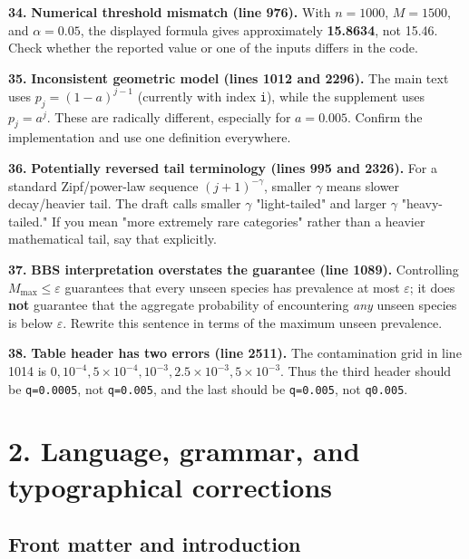\documentclass[10pt,a4paper]{article}
\begin{document}
\par\medskip\noindent\textbf{34.} \textbf{Numerical threshold mismatch (line 976).} With \(n=1000\), \(M=1500\), and \(\alpha=0.05\), the displayed formula gives approximately \textbf{15.8634}, not 15.46. Check whether the reported value or one of the inputs differs in the code.

\par\medskip\noindent\textbf{35.} \textbf{Inconsistent geometric model (lines 1012 and 2296).} The main text uses \(p_j=(1-a)^{j-1}\) (currently with index \texttt{i}), while the supplement uses \(p_j=a^j\). These are radically different, especially for \(a=0.005\). Confirm the implementation and use one definition everywhere.

\par\medskip\noindent\textbf{36.} \textbf{Potentially reversed tail terminology (lines 995 and 2326).} For a standard Zipf/power-law sequence \((j+1)^{-\gamma}\), smaller \(\gamma\) means slower decay/heavier tail. The draft calls smaller \(\gamma\) "light-tailed" and larger \(\gamma\) "heavy-tailed." If you mean "more extremely rare categories" rather than a heavier mathematical tail, say that explicitly.

\par\medskip\noindent\textbf{37.} \textbf{BBS interpretation overstates the guarantee (line 1089).} Controlling \(M_{\max}\le\varepsilon\) guarantees that every unseen species has prevalence at most \(\varepsilon\); it does \textbf{not} guarantee that the aggregate probability of encountering \emph{any} unseen species is below \(\varepsilon\). Rewrite this sentence in terms of the maximum unseen prevalence.

\par\medskip\noindent\textbf{38.} \textbf{Table header has two errors (line 2511).} The contamination grid in line 1014 is \(0,10^{-4},5\times10^{-4},10^{-3},2.5\times10^{-3},5\times10^{-3}\). Thus the third header should be \texttt{q=0.0005}, not \texttt{q=0.005}, and the last should be \texttt{q=0.005}, not \texttt{q0.005}.

\section*{2. Language, grammar, and typographical corrections}

\subsection*{Front matter and introduction}
\end{document}
